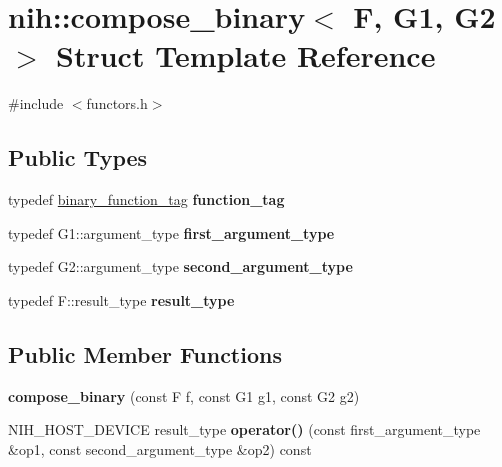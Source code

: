 \hypertarget{structnih_1_1compose__binary}{
\section{nih\-:\-:compose\-\_\-binary$<$ \-F, \-G1, \-G2 $>$ \-Struct \-Template \-Reference}
\label{structnih_1_1compose__binary}
}


{\ttfamily \#include $<$functors.\-h$>$}

\subsection*{\-Public \-Types}
\begin{DoxyCompactItemize}
\item 
\hypertarget{structnih_1_1compose__binary_a075aea9567f7858022311d2000f2b631}{
typedef \hyperlink{structnih_1_1binary__function__tag}{binary\-\_\-function\-\_\-tag} {\bfseries function\-\_\-tag}}
\label{structnih_1_1compose__binary_a075aea9567f7858022311d2000f2b631}

\item 
\hypertarget{structnih_1_1compose__binary_aa067ca48332527cf78fa097623e7408c}{
typedef \-G1\-::argument\-\_\-type {\bfseries first\-\_\-argument\-\_\-type}}
\label{structnih_1_1compose__binary_aa067ca48332527cf78fa097623e7408c}

\item 
\hypertarget{structnih_1_1compose__binary_a2056438d27e2e0ddbdb18dd9e3626c7e}{
typedef \-G2\-::argument\-\_\-type {\bfseries second\-\_\-argument\-\_\-type}}
\label{structnih_1_1compose__binary_a2056438d27e2e0ddbdb18dd9e3626c7e}

\item 
\hypertarget{structnih_1_1compose__binary_ab08e4342df9e1c663ff04c7886e226b7}{
typedef \-F\-::result\-\_\-type {\bfseries result\-\_\-type}}
\label{structnih_1_1compose__binary_ab08e4342df9e1c663ff04c7886e226b7}

\end{DoxyCompactItemize}
\subsection*{\-Public \-Member \-Functions}
\begin{DoxyCompactItemize}
\item 
\hypertarget{structnih_1_1compose__binary_aea6ba75dbf49e5b8769b9f30dbf4090f}{
{\bfseries compose\-\_\-binary} (const \-F f, const \-G1 g1, const \-G2 g2)}
\label{structnih_1_1compose__binary_aea6ba75dbf49e5b8769b9f30dbf4090f}

\item 
\hypertarget{structnih_1_1compose__binary_a97bab3fa50c70c8e25a28b563a8ec04f}{
\-N\-I\-H\-\_\-\-H\-O\-S\-T\-\_\-\-D\-E\-V\-I\-C\-E result\-\_\-type {\bfseries operator()} (const first\-\_\-argument\-\_\-type \&op1, const second\-\_\-argument\-\_\-type \&op2) const }
\label{structnih_1_1compose__binary_a97bab3fa50c70c8e25a28b563a8ec04f}

\end{DoxyCompactItemize}


